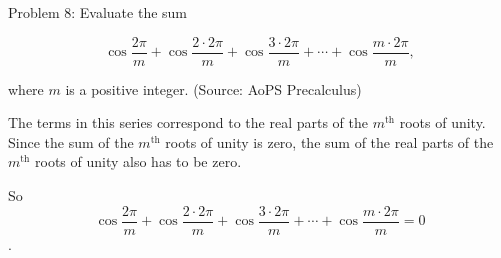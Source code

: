 Problem 8: Evaluate the sum

\[ \displaystyle \cos \frac{2\pi}{m} + \cos \frac{2\cdot 2\pi}{m} + \cos \frac{3\cdot 2\pi}{m} + \cdots + \cos \frac{m\cdot 2\pi}{m}, \]

where $m$ is a positive integer. (Source: AoPS Precalculus)

The terms in this series correspond to the real parts of the $m^{\text{th}}$ roots of unity. Since the sum of the $m^{\text{th}}$ roots of unity is zero, the sum of the real parts of the $m^{\text{th}}$ roots of unity also has to be zero.

So $$\boxed{\cos \frac{2\pi}{m} + \cos \frac{2\cdot 2\pi}{m} + \cos \frac{3\cdot 2\pi}{m} + \cdots + \cos \frac{m\cdot 2\pi}{m} = 0}$$.
